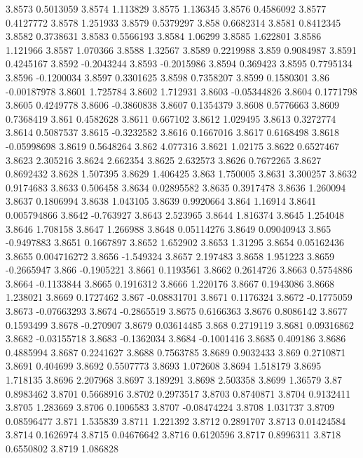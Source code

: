 3.8573  0.5013059
3.8574  1.113829
3.8575  1.136345
3.8576  0.4586092
3.8577  0.4127772
3.8578  1.251933
3.8579  0.5379297
3.858  0.6682314
3.8581  0.8412345
3.8582  0.3738631
3.8583  0.5566193
3.8584  1.06299
3.8585  1.622801
3.8586  1.121966
3.8587  1.070366
3.8588  1.32567
3.8589  0.2219988
3.859  0.9084987
3.8591  0.4245167
3.8592  -0.2043244
3.8593  -0.2015986
3.8594  0.369423
3.8595  0.7795134
3.8596  -0.1200034
3.8597  0.3301625
3.8598  0.7358207
3.8599  0.1580301
3.86  -0.00187978
3.8601  1.725784
3.8602  1.712931
3.8603  -0.05344826
3.8604  0.1771798
3.8605  0.4249778
3.8606  -0.3860838
3.8607  0.1354379
3.8608  0.5776663
3.8609  0.7368419
3.861  0.4582628
3.8611  0.667102
3.8612  1.029495
3.8613  0.3272774
3.8614  0.5087537
3.8615  -0.3232582
3.8616  0.1667016
3.8617  0.6168498
3.8618  -0.05998698
3.8619  0.5648264
3.862  4.077316
3.8621  1.02175
3.8622  0.6527467
3.8623  2.305216
3.8624  2.662354
3.8625  2.632573
3.8626  0.7672265
3.8627  0.8692432
3.8628  1.507395
3.8629  1.406425
3.863  1.750005
3.8631  3.300257
3.8632  0.9174683
3.8633  0.506458
3.8634  0.02895582
3.8635  0.3917478
3.8636  1.260094
3.8637  0.1806994
3.8638  1.043105
3.8639  0.9920664
3.864  1.16914
3.8641  0.005794866
3.8642  -0.763927
3.8643  2.523965
3.8644  1.816374
3.8645  1.254048
3.8646  1.708158
3.8647  1.266988
3.8648  0.05114276
3.8649  0.09040943
3.865  -0.9497883
3.8651  0.1667897
3.8652  1.652902
3.8653  1.31295
3.8654  0.05162436
3.8655  0.004716272
3.8656  -1.549324
3.8657  2.197483
3.8658  1.951223
3.8659  -0.2665947
3.866  -0.1905221
3.8661  0.1193561
3.8662  0.2614726
3.8663  0.5754886
3.8664  -0.1133844
3.8665  0.1916312
3.8666  1.220176
3.8667  0.1943086
3.8668  1.238021
3.8669  0.1727462
3.867  -0.08831701
3.8671  0.1176324
3.8672  -0.1775059
3.8673  -0.07663293
3.8674  -0.2865519
3.8675  0.6166363
3.8676  0.8086142
3.8677  0.1593499
3.8678  -0.270907
3.8679  0.03614485
3.868  0.2719119
3.8681  0.09316862
3.8682  -0.03155718
3.8683  -0.1362034
3.8684  -0.1001416
3.8685  0.409186
3.8686  0.4885994
3.8687  0.2241627
3.8688  0.7563785
3.8689  0.9032433
3.869  0.2710871
3.8691  0.404699
3.8692  0.5507773
3.8693  1.072608
3.8694  1.518179
3.8695  1.718135
3.8696  2.207968
3.8697  3.189291
3.8698  2.503358
3.8699  1.36579
3.87  0.8983462
3.8701  0.5668916
3.8702  0.2973517
3.8703  0.8740871
3.8704  0.9132411
3.8705  1.283669
3.8706  0.1006583
3.8707  -0.08474224
3.8708  1.031737
3.8709  0.08596477
3.871  1.535839
3.8711  1.221392
3.8712  0.2891707
3.8713  0.01424584
3.8714  0.1626974
3.8715  0.04676642
3.8716  0.6120596
3.8717  0.8996311
3.8718  0.6550802
3.8719  1.086828
